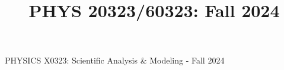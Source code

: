 \documentclass[12pt]{article}
\begin{document}
\def\pos{\medskip\quad}
\def\subpos{\smallskip \qquad}

\begin{center}
{\large
PHYSICS  X0323: Scientific Analysis \& Modeling - Fall 2024
}\\

\title{PHYS 20323/60323: Fall 2024}


\maketitle


\end{center}
\end{document}
